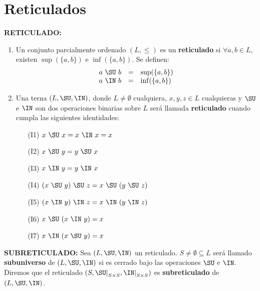 \section{Reticulados}

  \PN \textbf{RETICULADO:}
  \begin{enumerate}
    \item Un conjunto parcialmente ordenado $(L,\leq)$ es un \textbf{reticulado} si $\forall a, b \in L$, existen
    $\sup(\{a,b\})$ e $\inf(\{a,b\})$. Se definen:
    \[
      \begin{array}{rcl}
        a \ \SU \ b &=& \sup(\{a,b\}) \\
        a \ \IN \ b &=& \inf(\{a,b\})
      \end{array}
    \]

    \item Una terna $(L, \SU,\IN)$, donde $L \neq \emptyset$ cualquiera, $x, y, z \in L$ cualquieras y $\SU$ e
    $\IN$ son dos operaciones binarias sobre $L$ será llamada \textbf{reticulado} cuando cumpla las siguientes
    identidades:
    \begin{enumerate}
      \item[(I1)] $x \ \SU \ x = x \ \IN \ x = x$
      \item[(I2)] $x \ \SU \ y = y \ \SU \ x$
      \item[(I3)] $x \ \IN \ y = y \ \IN \ x$
      \item[(I4)] $(x \ \SU \ y) \ \SU \ z = x \ \SU \ (y \ \SU \ z)$
      \item[(I5)] $(x \ \IN \ y) \ \IN \ z = x \ \IN \ (y \ \IN \ z)$
      \item[(I6)] $x \ \SU \ (x \ \IN \ y) = x$
      \item[(I7)] $x \ \IN \ (x \ \SU \ y) = x$
    \end{enumerate}
  \end{enumerate}

  \vspace{3mm}
  \PN \textbf{SUBRETICULADO:} Sea $(L, \SU, \IN)$ un reticulado. $S \neq \emptyset \subseteq L$ será
  llamado \textbf{subuniverso} de $(L, \SU, \IN)$ si es cerrado bajo las operaciones $\SU$ e $\IN$. Diremos que el
  reticulado $(S, \SU\mathrm{\mid}_{S \times S}, \IN\mathrm{\mid}_{S \times S})$ es \textbf{subreticulado} de
  $(L, \SU, \IN)$.

